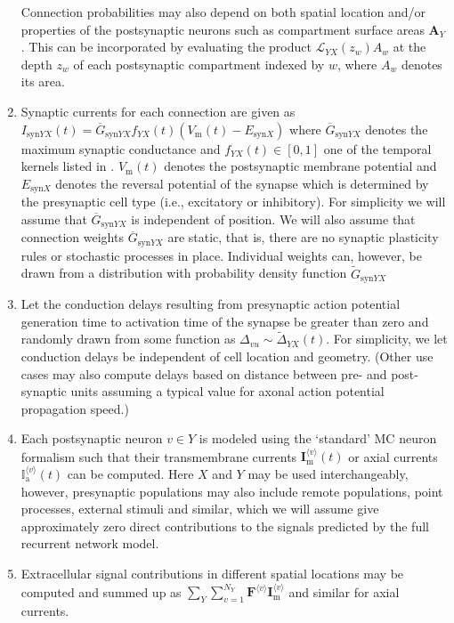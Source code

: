 \begin{enumerate}
Connection probabilities may also depend on both spatial location and/or properties of the postsynaptic neurons such as compartment surface areas $\mathbf{A}_Y$. 
This can be incorporated by evaluating the product $\mathcal{L}_{YX}(z_w)A_w$  at the depth $z_w$ of each postsynaptic compartment indexed by $w$, where $A_w$ denotes its area. 
\item Synaptic currents for each connection are given as $I_{\text{syn}YX}(t)=\overline{G}_{\text{syn}YX} f_{YX}(t)(V_\text{m}(t)-E_{\text{syn}X})$
where $\overline{G}_{\text{syn}YX}$ denotes the maximum synaptic conductance and $f_{YX}(t) \in [0, 1]$ one of the temporal kernels listed in .
$V_\text{m}(t)$ denotes the postsynaptic membrane potential and 
$E_{\text{syn}X}$ denotes the reversal potential of the synapse which is determined by the presynaptic cell type (i.e., excitatory or inhibitory).
For simplicity we will assume that $\overline{G}_{\text{syn}YX}$ is independent of position.
We will also assume that connection weights $\overline{G}_{\text{syn}YX}$ are static, 
that is, there are no synaptic plasticity rules or stochastic processes in place. 
Individual weights can, however, be drawn from a distribution with probability density function $\widetilde{G}_{\text{syn}YX}$
\item Let the conduction delays resulting from presynaptic action potential generation time to activation time of the synapse be greater than zero and randomly drawn from some function as $\Delta_{vu} \sim \widetilde{\Delta}_{YX}(t)$.
For simplicity, we let conduction delays be independent of cell location and geometry.
(Other use cases may also compute delays based on distance between pre- and post-synaptic units assuming a typical value for axonal action potential propagation speed.)
\item Each postsynaptic neuron $v \in Y$ is modeled using the  `standard' MC neuron formalism such that their transmembrane currents $\mathbf{I}_\text{m}^{\langle v \rangle}(t)$ or axial currents $\mathbb{I}_\text{a}^{\langle v \rangle}(t)$ can be computed.
Here $X$ and $Y$ may be used interchangeably, however,
presynaptic populations may also include remote populations, point processes, external stimuli and similar,
which we will assume give approximately zero direct contributions to the signals predicted by the full recurrent network model.
\item Extracellular signal contributions in different spatial locations may be computed and summed up as
$\sum_Y \sum_{v=1}^{N_Y} \mathbf{F}^{\langle v \rangle} \mathbf{I}_\text{m}^{\langle v \rangle}$ and similar for axial currents.

\end{enumerate}
